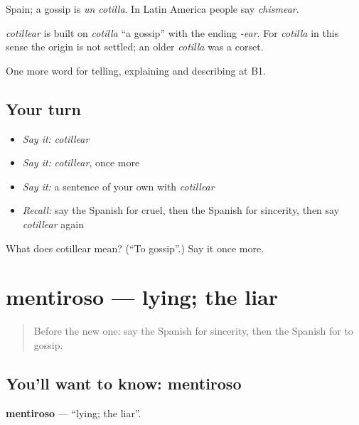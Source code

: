 Spain; a gossip is \emph{un cotilla}. In Latin America people say \emph{chismear}.

\begin{cousinweb}
\emph{cotillear} is built on \emph{cotilla} \textquotedblleft{}a gossip\textquotedblright{} with the ending \emph{-ear}. For \emph{cotilla} in this sense the origin is not settled; an older \emph{cotilla} was a corset.
\end{cousinweb}

\begin{grammarlens}[title={What you've built}]
One more word for telling, explaining and describing at B1.
\end{grammarlens}

\subsection*{Your turn}
\begin{itemize}
\raggedright
  \item \emph{Say it:} \emph{cotillear}
  \item \emph{Say it:} \emph{cotillear}, once more
  \item \emph{Say it:} a sentence of your own with \emph{cotillear}
  \item \emph{Recall:} say the Spanish for cruel, then the Spanish for sincerity, then say \emph{cotillear} again
\end{itemize}

\begin{tcolorbox}[breakable,colback=teal!4,colframe=teal!35!black,title={Before you move on}]
What does cotillear mean? (\textquotedblleft{}To gossip\textquotedblright{}.) Say it once more.
\end{tcolorbox}
\section[mentiroso]{mentiroso — lying; the liar}

\label{lesson:ES-C724-mentiroso}



\begin{quote}
Before the new one: say the Spanish for sincerity, then the Spanish for to gossip.
\end{quote}

\subsection*{You'll want to know: mentiroso}
\textbf{mentiroso} — \textquotedblleft{}lying; the liar\textquotedblright{}.

